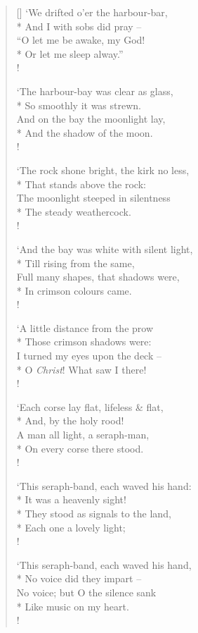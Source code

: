 \documentclass[MAIN]{subfiles}
\begin{document}
\begin{verse}[\versewidth]
`We drifted o'er the harbour-bar,\\*
\vin And I with sobs did pray --\\
``O let me be awake, my God!\\*
\vin Or let me sleep alway.''\\!

`The harbour-bay was clear as glass,\\*
\vin So smoothly it was strewn.\\
And on the bay the moonlight lay,\\*
\vin And the shadow of the moon.\\!

`The rock shone bright, the kirk no less,\\*
\vin That stands above the rock:\\
The moonlight steeped in silentness\\*
\vin The steady weathercock.\\!

`And the bay was white with silent light,\\*
\vin Till rising from the same,\\
Full many shapes, that shadows were,\\*
\vin In crimson colours came.\\!

`A little distance from the prow\\*
\vin Those crimson shadows were:\\
I turned my eyes upon the deck --\\*
\vin O \emph{Christ}! What saw I there!\\!

`Each corse lay flat, lifeless \& flat,\\*
\vin And, by the holy rood!\\
A man all light, a seraph-man,\\*
\vin On every corse there stood.\\!

`This seraph-band, each waved his hand:\\*
\vin It was a heavenly sight!\\*
They stood as signals to the land,\\*
\vin Each one a lovely light;\\!

`This seraph-band, each waved his hand,\\*
\vin No voice did they impart --\\
No voice; but O the silence sank\\*
\vin Like music on my heart.\\!


\end{verse}
\end{document}
